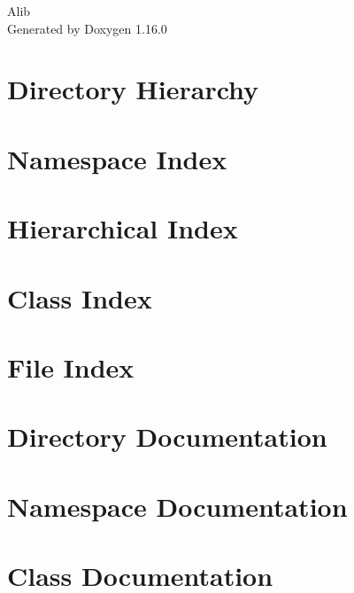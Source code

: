 \documentclass[twoside]{book}
\newcommand{\+}{\discretionary{\mbox{\scriptsize$\hookleftarrow$}}{}{}}
\newcommand{\clearemptydoublepage}{%
    \newpage{\pagestyle{empty}\cleardoublepage}%
  }
\begin{document}
  \raggedbottom
    \hypersetup{pageanchor=false,
                bookmarksnumbered=true,
                pdfencoding=unicode
               }
  \begin{titlepage}
  \vspace*{7cm}
  \begin{center}%
  {\Large Alib}\\
  \vspace*{1cm}
  {\large Generated by Doxygen 1.16.0}\\
  \end{center}
  \end{titlepage}
  \clearemptydoublepage
  \tableofcontents
  \clearemptydoublepage
  \hypersetup{pageanchor=true}
\chapter{Directory Hierarchy}

\chapter{Namespace Index}

\chapter{Hierarchical Index}

\chapter{Class Index}

\chapter{File Index}

\chapter{Directory Documentation}

\chapter{Namespace Documentation}

\chapter{Class Documentation}








\end{document}
